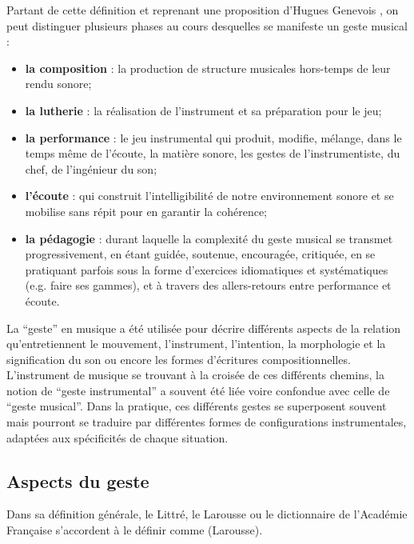 \indent Partant de cette définition et reprenant une proposition d'Hugues Genevois \cite{genevois_geste_1999}, on peut distinguer plusieurs phases au cours desquelles se manifeste un geste musical :
\vspace{-1em}
\begin{itemize}[noitemsep]
\item \textbf{la composition} : la production de structure musicales hors-temps de leur rendu sonore;
\item \textbf{la lutherie} : la réalisation de l'instrument et sa préparation pour le jeu;
\item \textbf{la performance} : le jeu instrumental qui produit, modifie, mélange, dans le temps même de l'écoute, la matière sonore, les gestes de l'instrumentiste, du chef, de l'ingénieur du son;
\item \textbf{l'écoute} : qui construit l'intelligibilité de notre environnement sonore et se mobilise sans répit pour en garantir la cohérence;
\item \textbf{la pédagogie} : durant laquelle la complexité du geste musical se transmet progressivement, en étant guidée, soutenue, encouragée, critiquée, en se pratiquant parfois sous la forme d'exercices idiomatiques et systématiques (e.g. faire ses gammes), et à travers des allers-retours entre performance et écoute.
\end{itemize}
\noindent La ``geste'' en musique a été utilisée pour décrire différents aspects de la relation qu'entretiennent le mouvement, l'instrument, l'intention, la morphologie et la signification du son ou encore les formes d'écritures compositionnelles. L'instrument de musique se trouvant à la croisée de ces différents chemins, la notion de ``geste instrumental'' a souvent été liée voire confondue avec celle de ``geste musical''. Dans la pratique, ces différents gestes se superposent souvent mais pourront se traduire par différentes formes de configurations instrumentales, adaptées aux spécificités de chaque situation.

\subsection{Aspects du geste}

\noindent Dans sa définition générale, le Littré, le Larousse ou le dictionnaire de l'Académie Française s'accordent à le définir comme  (Larousse).

